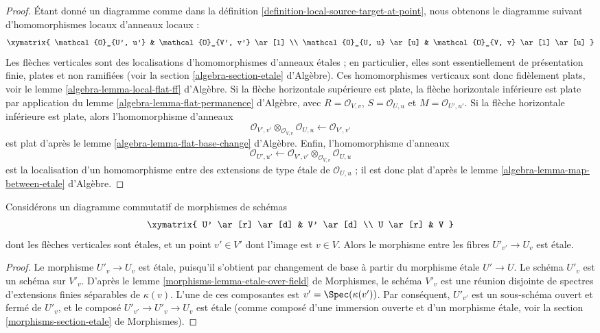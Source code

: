 \begin{proof}
Étant donné un diagramme comme dans la
définition \ref{definition-local-source-target-at-point}, nous obtenons le
diagramme suivant d'homomorphismes locaux d'anneaux locaux :
$$
\xymatrix{
\mathcal{O}_{U', u'} & \mathcal{O}_{V', v'} \ar[l] \\
\mathcal{O}_{U, u} \ar[u] & \mathcal{O}_{V, v} \ar[l] \ar[u]
}
$$
Les flèches verticales sont des localisations d'homomorphismes d'anneaux
étales ; en particulier, elles sont essentiellement de présentation finie,
plates et non ramifiées (voir
la section \ref{algebra-section-etale} d'Algèbre).
Ces homomorphismes verticaux sont donc fidèlement plats, voir le
lemme \ref{algebra-lemma-local-flat-ff} d'Algèbre.
Si la flèche horizontale supérieure est plate, la flèche horizontale
inférieure est plate par application du
lemme \ref{algebra-lemma-flat-permanence} d'Algèbre,
avec $R = \mathcal{O}_{V, v}$, $S = \mathcal{O}_{U, u}$ et
$M = \mathcal{O}_{U', u'}$. Si la flèche horizontale inférieure est
plate, alors l'homomorphisme d'anneaux
$$
\mathcal{O}_{V', v'} \otimes_{\mathcal{O}_{V, v}} \mathcal{O}_{U, u}
\longleftarrow
\mathcal{O}_{V', v'}
$$
est plat d'après le
lemme \ref{algebra-lemma-flat-base-change} d'Algèbre.
Enfin, l'homomorphisme d'anneaux
$$
\mathcal{O}_{U', u'}
\longleftarrow
\mathcal{O}_{V', v'} \otimes_{\mathcal{O}_{V, v}} \mathcal{O}_{U, u}
$$
est la localisation d'un homomorphisme entre des extensions de type \'etale de
$\mathcal{O}_{U, u}$ ; il est donc plat d'après le
lemme \ref{algebra-lemma-map-between-etale} d'Algèbre.
\end{proof}

\begin{lemma}
\label{lemma-etale-on-fiber}
Considérons un diagramme commutatif de morphismes de schémas
$$
\xymatrix{
U' \ar[r] \ar[d] & V' \ar[d] \\
U \ar[r] & V
}
$$
dont les flèches verticales sont étales, et un point $v' \in V'$
dont l'image est $v \in V$. Alors le morphisme entre les fibres
$U'_{v'} \to U_v$ est \'etale.
\end{lemma}

\begin{proof}
Le morphisme $U'_v \to U_v$ est \'etale, puisqu'il s'obtient par
changement de base à partir du morphisme \'etale $U' \to U$.
Le schéma $U'_v$ est un schéma sur $V'_v$. D'après le
lemme \ref{morphisms-lemma-etale-over-field} de Morphismes, le schéma
$V'_v$ est une réunion disjointe de spectres d'extensions finies séparables
de $\kappa(v)$. L'une de ces composantes est
$v' = \Spec(\kappa(v'))$. Par conséquent, $U'_{v'}$ est un sous-schéma
ouvert et fermé de $U'_v$, et le composé
$U'_{v'} \to U'_v \to U_v$ est \'etale (comme composé d'une immersion
ouverte et d'un morphisme \'etale, voir la
section \ref{morphisms-section-etale} de Morphismes).
\end{proof}

